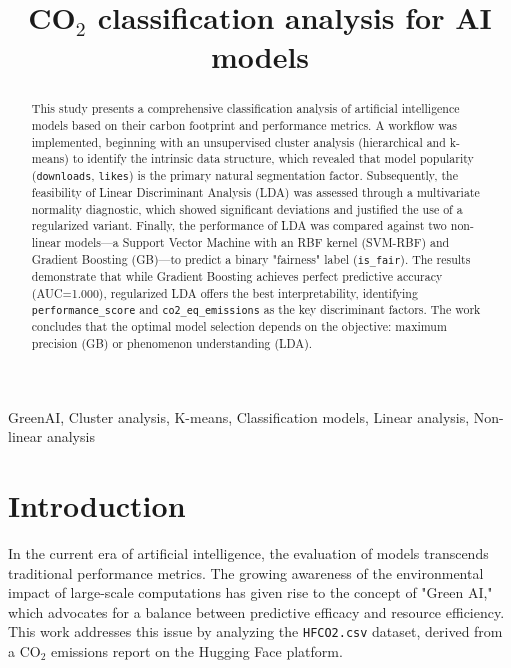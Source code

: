\documentclass[journal]{IEEEtran}
\title{ CO$_{2}$ classification analysis for AI models}
\author{
	\IEEEauthorblockN{Juan Felipe Gallo Rendón\IEEEauthorrefmark{1}}
	\IEEEauthorblockA{\textit{Engineering department} \\
		\textit{University of Antioquia}\\
		Medellín, Colombia}
}
\begin{document}
	\maketitle

\begin{abstract}
	This study presents a comprehensive classification analysis of artificial intelligence models based on their carbon footprint and performance metrics. A workflow was implemented, beginning with an unsupervised cluster analysis (hierarchical and k-means) to identify the intrinsic data structure, which revealed that model popularity (\texttt{downloads}, \texttt{likes}) is the primary natural segmentation factor. Subsequently, the feasibility of Linear Discriminant Analysis (LDA) was assessed through a multivariate normality diagnostic, which showed significant deviations and justified the use of a regularized variant. Finally, the performance of LDA was compared against two non-linear models—a Support Vector Machine with an RBF kernel (SVM-RBF) and Gradient Boosting (GB)—to predict a binary "fairness" label (\texttt{is\_fair}). The results demonstrate that while Gradient Boosting achieves perfect predictive accuracy (AUC=1.000), regularized LDA offers the best interpretability, identifying \texttt{performance\_score} and \texttt{co2\_eq\_emissions} as the key discriminant factors. The work concludes that the optimal model selection depends on the objective: maximum precision (GB) or phenomenon understanding (LDA).
\end{abstract}

	\begin{IEEEkeywords}
		GreenAI, Cluster analysis, K-means, Classification models, Linear analysis, Non-linear analysis
	\end{IEEEkeywords}


\section{Introduction}

In the current era of artificial intelligence, the evaluation of models transcends traditional performance metrics. The growing awareness of the environmental impact of large-scale computations has given rise to the concept of "Green AI," which advocates for a balance between predictive efficacy and resource efficiency. This work addresses this issue by analyzing the \texttt{HFCO2.csv} dataset, derived from a CO$_{2}$ emissions report on the Hugging Face platform.
\end{document}

